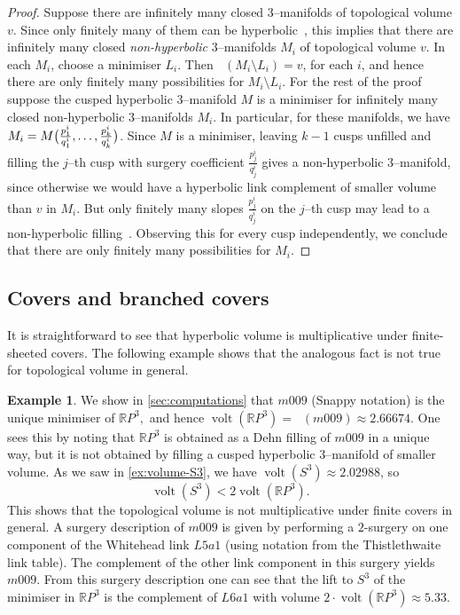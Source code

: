 \documentclass[a4paper]{gtart}
\theoremstyle{definition}
\newtheorem{example}[proposition]{Example}
\theoremstyle{remark}
\numberwithin{equation}{section}
\newcommand{\R}{\mathbb{R}}
\DeclareMathOperator{\volt}{volt}
\DeclareMathOperator{\volh}{vol_{\mathbb{H}}}
\begin{document}
\begin{proof}
Suppose there are infinitely many closed 3--manifolds of topological volume $v$. Since only finitely many of them can be hyperbolic~\cite{thurston-notes}, this implies that there are infinitely many closed {\it non-hyperbolic} 3--manifolds $M_i$ of topological volume $v.$
In each $M_i$, choose a minimiser $L_i$. Then $\volh(M_i\setminus L_i) =v$, for each $i$, and hence there are only finitely many possibilities for $M_i\setminus L_i.$ For the rest of the proof suppose the cusped hyperbolic 3--manifold $M$ is a minimiser for infinitely many closed non-hyperbolic 3--manifolds $M_i$. In particular, for these manifolds, we have $M_i = M\big{(}\frac{p^i_1}{q^i_1}, \ldots, \frac{p^i_k}{q^i_k}\big{)}$. Since $M$ is a minimiser, leaving $k-1$ cusps unfilled and filling the $j$--th cusp with surgery coefficient $\frac{p^i_j}{q^i_j}$ gives a non-hyperbolic 3--manifold, since otherwise we would have a hyperbolic link complement of smaller volume than $v$ in $M_i.$ But only finitely many slopes $\frac{p^i_j}{q^i_j}$ on the $j$--th cusp may lead to a non-hyperbolic filling~\cite{thurston-notes}. Observing this for every cusp independently, we conclude that there are only finitely many possibilities for $M_i.$
\end{proof}

\subsection{Covers and branched covers}
\label{sec:covers}

It is straightforward to see that hyperbolic volume is multiplicative under finite-sheeted covers. The following example shows that the analogous fact is not true for topological volume in general. 

\begin{example}
We show in \cref{sec:computations} that $m009$ (Snappy notation) is the unique minimiser of $\R P^3,$ and hence 
$\volt(\R P^3)=\volh(m009)\approx 2.66674$. One sees this by noting that $\R P^3$ is obtained as a Dehn filling of $m009$ in a unique way, but it is not obtained by filling a cusped hyperbolic 3--manifold of smaller volume. As we saw in \cref{ex:volume-S3}, we have $\volt(S^3)\approx 2.02988$, so 
$$\volt(S^3) < 2\volt(\R P^3).$$
This shows that the topological volume is not multiplicative under finite covers in general. A surgery description of $m009$ is given by performing a $2$-surgery on one component of the Whitehead link $L5a1$ (using notation from the Thistlethwaite link table). The complement of the other link component in this surgery yields $m009$. From this surgery description one can see that the lift to $S^3$ of the minimiser in $\R P^3$  is the complement of $L6a1$ with volume $2 \cdot \volt (\mathbb{R}P^3) \approx 5.33$.
\end{example}
\end{document}
